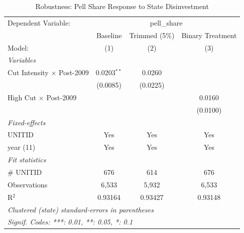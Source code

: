 
\begin{table}[htbp]
   \caption{\label{tab:robust} Robustness: Pell Share Response to State Disinvestment}
   \centering
   \begin{tabular}{lccc}
      \tabularnewline \midrule \midrule
      Dependent Variable: & \multicolumn{3}{c}{pell\_share}\\
                                        & Baseline      & Trimmed (5\%)  & Binary Treatment \\   
      Model:                            & (1)           & (2)            & (3)\\  
      \midrule
      \emph{Variables}\\
      Cut Intensity $\times$ Post-2009  & 0.0203$^{**}$ & 0.0260         &   \\   
                                        & (0.0085)      & (0.0225)       &   \\   
      High Cut $\times$ Post-2009       &               &                & 0.0160\\   
                                        &               &                & (0.0100)\\   
      \midrule
      \emph{Fixed-effects}\\
      UNITID                            & Yes           & Yes            & Yes\\  
      year (11)                         & Yes           & Yes            & Yes\\  
      \midrule
      \emph{Fit statistics}\\
      \# UNITID                         & 676           & 614            & 676\\  
      Observations                      & 6,533         & 5,932          & 6,533\\  
      R$^2$                             & 0.93164       & 0.93427        & 0.93148\\  
      \midrule \midrule
      \multicolumn{4}{l}{\emph{Clustered (state) standard-errors in parentheses}}\\
      \multicolumn{4}{l}{\emph{Signif. Codes: ***: 0.01, **: 0.05, *: 0.1}}\\
   \end{tabular}
\end{table}



